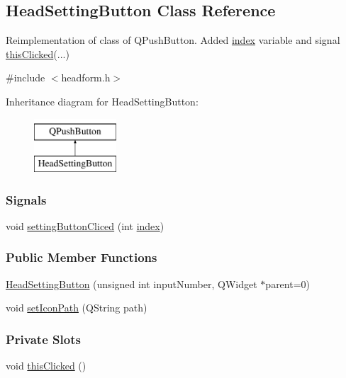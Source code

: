 \hypertarget{classHeadSettingButton}{}\subsection{Head\+Setting\+Button Class Reference}
\label{classHeadSettingButton}
Reimplementation of class of Q\+Push\+Button. Added \hyperlink{classHeadSettingButton_ad583fdc744e019c787477694427cdde0}{index} variable and signal \hyperlink{classHeadSettingButton_a9b462518ae3b222488fbec936c39c294}{this\+Clicked}(...)

{\ttfamily \#include $<$headform.\+h$>$}

Inheritance diagram for Head\+Setting\+Button\+:\begin{figure}[H]
\begin{center}
\leavevmode
\includegraphics[height=2.000000cm]{classHeadSettingButton}
\end{center}
\end{figure}
\subsubsection*{Signals}
\begin{DoxyCompactItemize}
\item 
void \mbox{\hyperlink{classHeadSettingButton_acd459234032c48f57a7a964c214ca0bf}{setting\+Button\+Cliced}} (int \mbox{\hyperlink{classHeadSettingButton_ad583fdc744e019c787477694427cdde0}{index}})
\end{DoxyCompactItemize}
\subsubsection*{Public Member Functions}
\begin{DoxyCompactItemize}
\item 
\mbox{\hyperlink{classHeadSettingButton_a098c4f2a77e710e4034b085923b1a556}{Head\+Setting\+Button}} (unsigned int input\+Number, Q\+Widget $\ast$parent=0)
\item 
void \mbox{\hyperlink{classHeadSettingButton_a9fe218e02cfc06467659eabbd7f4a794}{set\+Icon\+Path}} (Q\+String path)
\end{DoxyCompactItemize}
\subsubsection*{Private Slots}
\begin{DoxyCompactItemize}
\item 
void \mbox{\hyperlink{classHeadSettingButton_a9b462518ae3b222488fbec936c39c294}{this\+Clicked}} ()
\end{DoxyCompactItemize}
